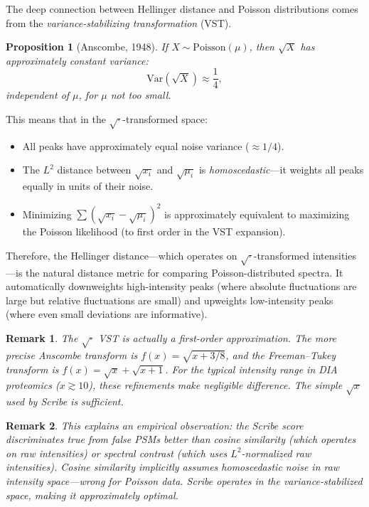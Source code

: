 \documentclass[11pt,a4paper]{article}
\newcommand{\Var}{\mathrm{Var}}
\newtheorem{proposition}{Proposition}
\newtheorem{remark}{Remark}
\begin{document}
The deep connection between Hellinger distance and Poisson distributions comes from the
\emph{variance-stabilizing transformation} (VST).

\begin{proposition}[Anscombe, 1948]
If $X \sim \mathrm{Poisson}(\mu)$, then $\sqrt{X}$ has approximately constant variance:
\begin{equation}
    \Var(\sqrt{X}) \approx \frac{1}{4},
\end{equation}
independent of $\mu$, for $\mu$ not too small.
\end{proposition}

This means that in the $\sqrt{\cdot}$-transformed space:
\begin{itemize}[]
    \item All peaks have approximately equal noise variance ($\approx 1/4$).
    \item The $L^2$ distance between $\sqrt{x_i}$ and $\sqrt{\mu_i}$ is
          \emph{homoscedastic}---it weights all peaks equally in units of their noise.
    \item Minimizing $\sum(\sqrt{x_i} - \sqrt{\mu_i})^2$ is approximately equivalent to
          maximizing the Poisson likelihood (to first order in the VST expansion).
\end{itemize}

Therefore, the Hellinger distance---which operates on $\sqrt{\cdot}$-transformed
intensities---is the natural distance metric for comparing Poisson-distributed spectra.
It automatically downweights high-intensity peaks (where absolute fluctuations are large
but relative fluctuations are small) and upweights low-intensity peaks (where even small
deviations are informative).

\begin{remark}
The $\sqrt{\cdot}$ VST is actually a first-order approximation. The more precise Anscombe
transform is $f(x) = \sqrt{x + 3/8}$, and the Freeman--Tukey transform is
$f(x) = \sqrt{x} + \sqrt{x+1}$. For the typical intensity range in DIA proteomics
($x \gtrsim 10$), these refinements make negligible difference. The simple $\sqrt{x}$
used by Scribe is sufficient.
\end{remark}

\begin{remark}
This explains an empirical observation: the Scribe score discriminates true from false PSMs
better than cosine similarity (which operates on raw intensities) or spectral contrast
(which uses $L^2$-normalized raw intensities). Cosine similarity implicitly assumes
homoscedastic noise in raw intensity space---wrong for Poisson data. Scribe operates in
the variance-stabilized space, making it approximately optimal.
\end{remark}
\end{document}
